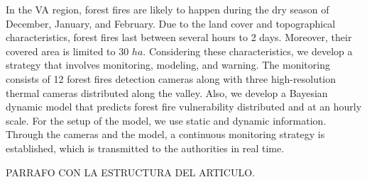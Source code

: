 In the VA region, forest fires are likely to happen during the dry season of December, January, and February. Due to the land cover and topographical characteristics, forest fires last between several hours to 2 days.  Moreover, their covered area is limited to 30 $ha$.  Considering these characteristics, we develop a strategy that involves monitoring, modeling, and warning. The monitoring consists of 12 forest fires detection cameras along with three high-resolution thermal cameras distributed along the valley.  Also, we develop a Bayesian dynamic model that predicts forest fire vulnerability distributed and at an hourly scale. For the setup of the model, we use static and dynamic information.   Through the cameras and the model, a continuous monitoring strategy is established, which is transmitted to the authorities in real time.

PARRAFO CON LA ESTRUCTURA DEL ARTICULO.



